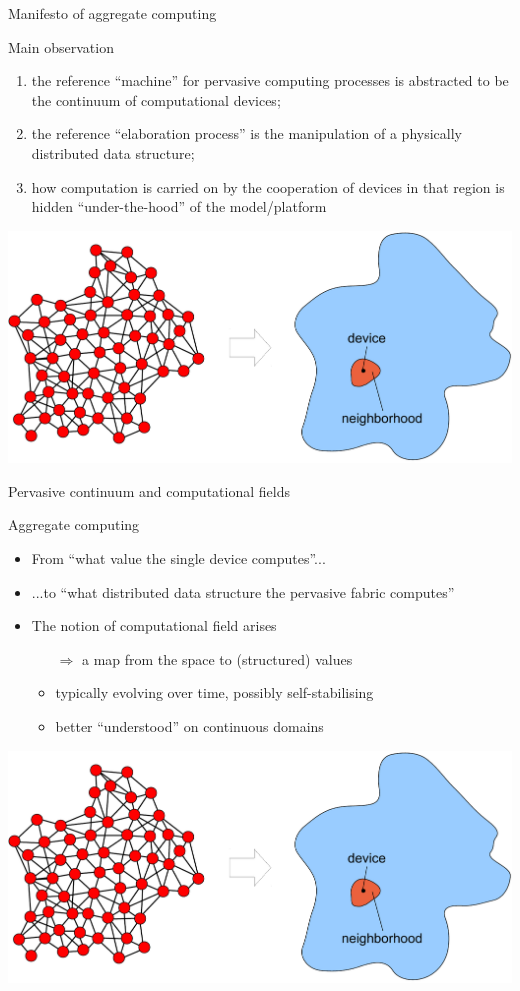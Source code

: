 \documentclass[presentation]{beamer} %
\begin{document}
\begin{frame}{Manifesto of aggregate computing}
  \begin{block}{Main observation}
    \begin{enumerate}
      \item the reference ``machine'' for pervasive computing processes is abstracted to be the continuum of computational devices;
      \item the reference ``elaboration process'' is the manipulation of a physically distributed data structure;
      \item how computation is carried on by the cooperation of devices in that region is hidden ``under-the-hood'' of the model/platform
    \end{enumerate}
  \end{block}
  \begin{center}
    \includegraphics[width=.65\textwidth]{images/amorphous.pdf}
  \end{center}
\end{frame}

\begin{frame}{Pervasive continuum and computational fields}
  \begin{block}{Aggregate computing}
    \begin{itemize}
      \item From ``what value the single device computes''...
      \item ...to ``what distributed data structure the pervasive fabric computes''
      \item The notion of \alert{computational field} arises \cite{tota,beal}
      \begin{itemize}
        \item[$\Rightarrow$] a map from the space to (structured) values
        \item typically evolving over time, possibly self-stabilising
        \item better ``understood'' on continuous domains
      \end{itemize}
    \end{itemize}
  \end{block}
  \begin{center}
    \includegraphics[width=.65\textwidth]{images/amorphous.pdf}
  \end{center}
\end{frame}
\end{document}
